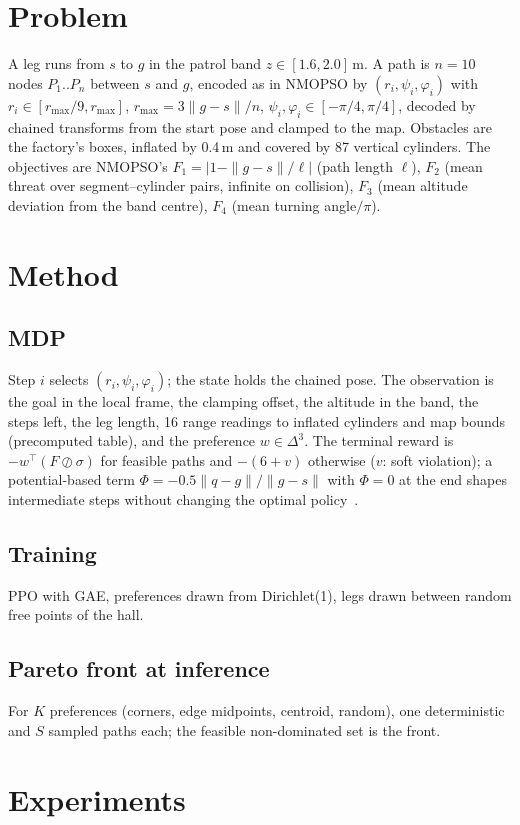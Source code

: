 \documentclass[conference]{IEEEtran}
\begin{document}
\section{Problem}
A leg runs from $s$ to $g$ in the patrol band $z\in[1.6,2.0]$\,m. A path is $n=10$ nodes
$P_1..P_n$ between $s$ and $g$, encoded as in NMOPSO by $(r_i,\psi_i,\varphi_i)$ with
$r_i\in[r_{\max}/9, r_{\max}]$, $r_{\max}=3\|g-s\|/n$, $\psi_i,\varphi_i\in[-\pi/4,\pi/4]$, decoded by
chained transforms from the start pose and clamped to the map. Obstacles are the factory's boxes,
inflated by 0.4\,m and covered by 87 vertical cylinders. The objectives are NMOPSO's
$F_1=|1-\|g-s\|/\ell|$ (path length $\ell$), $F_2$ (mean threat over segment--cylinder pairs, infinite
on collision), $F_3$ (mean altitude deviation from the band centre), $F_4$ (mean turning angle$/\pi$).

\section{Method}
\subsection{MDP}
Step $i$ selects $(r_i,\psi_i,\varphi_i)$; the state holds the chained pose. The observation is the
goal in the local frame, the clamping offset, the altitude in the band, the steps left, the leg
length, 16 range readings to inflated cylinders and map bounds (precomputed table), and the
preference $w\in\Delta^3$. The terminal reward is $-w^\top(F\oslash\sigma)$ for feasible paths and
$-(6+v)$ otherwise ($v$: soft violation); a potential-based term $\Phi=-0.5\|q-g\|/\|g-s\|$ with
$\Phi=0$ at the end shapes intermediate steps without changing the optimal policy~\cite{ng1999}.
\subsection{Training}
PPO with GAE, preferences drawn from Dirichlet(1), legs drawn between random free points of the hall.
\subsection{Pareto front at inference}
For $K$ preferences (corners, edge midpoints, centroid, random), one deterministic and $S$ sampled
paths each; the feasible non-dominated set is the front.

\section{Experiments}
\end{document}
